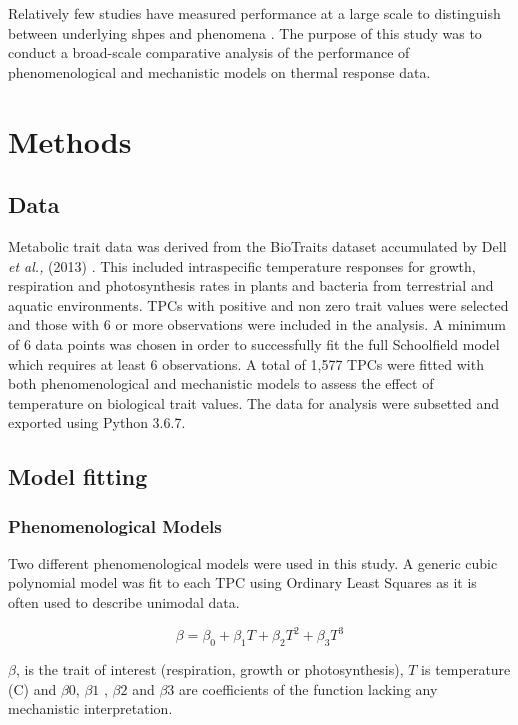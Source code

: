\documentclass[11pt]{article}
\begin{document}
\begin{linenumbers}
 Relatively few studies have measured performance at a large scale to distinguish between underlying shpes and phenomena \cite{pub.1026914980} \cite{Dowd1956}. The purpose of this study was to conduct a broad-scale comparative analysis of the performance of phenomenological and mechanistic models on thermal response data.

 \section{Methods}
 \subsection{Data}
 Metabolic trait data was derived from the BioTraits dataset accumulated by Dell \textit{et al.,} (2013) . This included intraspecific temperature responses for growth, respiration and photosynthesis rates in plants and bacteria from terrestrial and aquatic environments. 
 TPCs with positive and non zero trait values were selected and those with 6 or more observations were included in the analysis. A minimum of 6 data points was chosen in order to successfully fit the full Schoolfield model which requires at least 6 observations. A total of 1,577 TPCs were fitted with both phenomenological and mechanistic models to assess the effect of temperature on biological trait values. The data for analysis were subsetted and exported using Python 3.6.7.
 
 \subsection{Model fitting}
  \subsubsection{Phenomenological Models}
Two different phenomenological models were used in this study. A generic cubic polynomial model was fit to each TPC using Ordinary Least Squares as it is often used to describe unimodal data. 

\begin{equation}
\beta = \beta_0 + \beta_1 T + \beta_2 T^2 + \beta_3 T^3\tag{1}
\end{equation}

\(\beta\), is the trait of interest (respiration, growth or photosynthesis), \(T\) is temperature (\degree C) and \(\beta0\), \(\beta1\) , \(\beta2\)  and \(\beta3\) are coefficients of the function lacking any mechanistic interpretation.  


\end{linenumbers}
\end{document}

